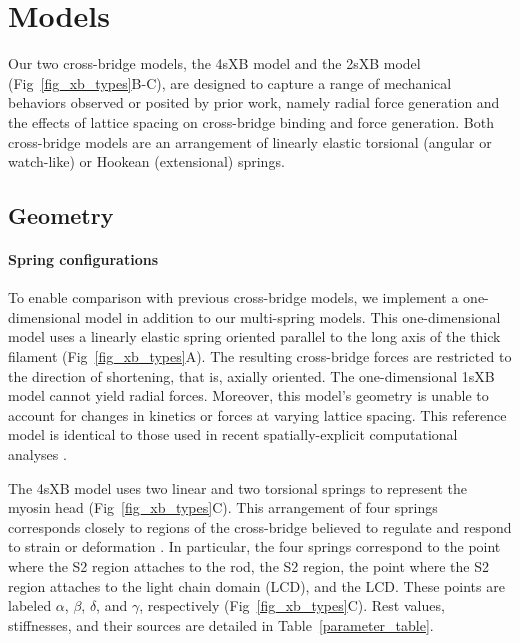 \documentclass[10pt]{article}
\newcommand{\citep}[1]{\cite{#1}} %
\begin{document}
\section*{Models}  %

Our two cross-bridge models, the 4sXB model and the 2sXB model (Fig~\ref{fig_xb_types}B-C), are designed to capture a range of mechanical behaviors observed or posited by prior work, namely radial force generation and the effects of lattice spacing on cross-bridge binding and force generation.  
Both cross-bridge models are an arrangement of linearly elastic torsional (angular or watch-like) or Hookean (extensional) springs.  

\subsection*{Geometry} %

\paragraph{Spring configurations} %
To enable comparison with previous cross-bridge models, we implement a one-dimensional model in addition to our multi-spring models. 
This one-dimensional model uses a linearly elastic spring oriented parallel to the long axis of the thick filament (Fig~\ref{fig_xb_types}A).  
The resulting cross-bridge forces are restricted to the direction of shortening, that is, axially oriented. 
The one-dimensional 1sXB model cannot yield radial forces.
Moreover, this model's geometry is unable to account for changes in kinetics or forces at varying lattice spacing. 
This reference model is identical to those used in recent spatially-explicit computational analyses \citep{Daniel1998, Chase2004, Tanner2007}. 

The 4sXB model uses two linear and two torsional springs to represent the myosin head (Fig~\ref{fig_xb_types}C).
This arrangement of four springs corresponds closely to regions of the cross-bridge believed to regulate and respond to strain or deformation \citep{Houdusse2001}.
In particular, the four springs correspond to the point where the S2 region attaches to the rod, the S2 region, the point where the S2 region attaches to the light chain domain (LCD), and the LCD.
These points are labeled $\alpha$, $\beta$, $\delta$, and $\gamma$, respectively (Fig~\ref{fig_xb_types}C).
Rest values, stiffnesses, and their sources are detailed in Table~\ref{parameter_table}. 
\end{document}
